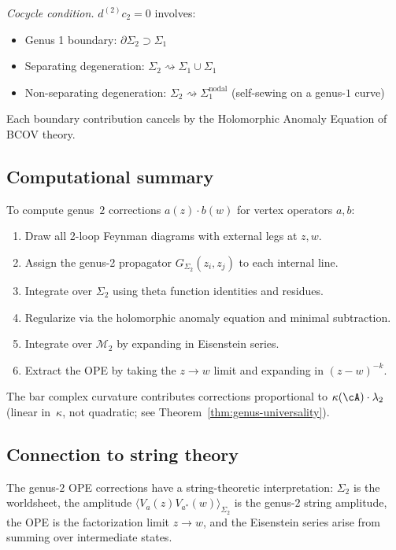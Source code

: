 \emph{Cocycle condition.} $d^{(2)} c_2 = 0$ involves:
\begin{itemize}
\item Genus 1 boundary: $\partial \Sigma_2 \supset \Sigma_1$
\item Separating degeneration: $\Sigma_2 \rightsquigarrow \Sigma_1 \cup \Sigma_1$
\item Non-separating degeneration: $\Sigma_2 \rightsquigarrow \Sigma_1^{\text{nodal}}$ (self-sewing on a genus-$1$ curve)
\end{itemize}

Each boundary contribution cancels by the Holomorphic Anomaly Equation of BCOV theory.

\subsection{Computational summary}

To compute genus~$2$ corrections $a(z) \cdot b(w)$ for vertex operators $a, b$:
\begin{enumerate}
\item Draw all 2-loop Feynman diagrams with external legs at $z, w$.
\item Assign the genus-2 propagator $G_{\Sigma_2}(z_i, z_j)$ to each internal line.
\item Integrate over $\Sigma_2$ using theta function identities and residues.
\item Regularize via the holomorphic anomaly equation and minimal subtraction.
\item Integrate over $\mathcal{M}_2$ by expanding in Eisenstein series.
\item Extract the OPE by taking the $z \to w$ limit and expanding in $(z-w)^{-k}$.
\end{enumerate}
The bar complex curvature contributes corrections proportional to $\kappa(\cA) \cdot \lambda_2$
(linear in~$\kappa$, not quadratic; see Theorem~\ref{thm:genus-universality}).

\subsection{Connection to string theory}

The genus-$2$ OPE corrections have a string-theoretic interpretation: $\Sigma_2$ is the worldsheet, the amplitude $\langle V_a(z) V_{a^*}(w) \rangle_{\Sigma_2}$ is the genus-$2$ string amplitude, the OPE is the factorization limit $z \to w$, and the Eisenstein series arise from summing over intermediate states.

